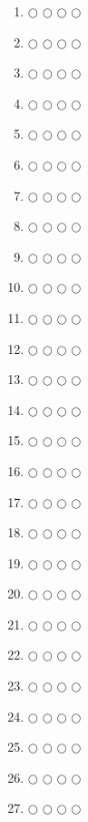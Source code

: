 \documentclass[a4paper,12pt]{article}
\begin{document}
\begin{multicols}{4}
\large
\begin{enumerate}
  \item $\bigcirc$ $\bigcirc$ $\bigcirc$ $\bigcirc$
  \item $\bigcirc$ $\bigcirc$ $\bigcirc$ $\bigcirc$
  \item $\bigcirc$ $\bigcirc$ $\bigcirc$ $\bigcirc$
  \item $\bigcirc$ $\bigcirc$ $\bigcirc$ $\bigcirc$
  \item $\bigcirc$ $\bigcirc$ $\bigcirc$ $\bigcirc$
  \item $\bigcirc$ $\bigcirc$ $\bigcirc$ $\bigcirc$
  \item $\bigcirc$ $\bigcirc$ $\bigcirc$ $\bigcirc$
  \item $\bigcirc$ $\bigcirc$ $\bigcirc$ $\bigcirc$
  \item $\bigcirc$ $\bigcirc$ $\bigcirc$ $\bigcirc$
  \item $\bigcirc$ $\bigcirc$ $\bigcirc$ $\bigcirc$
  \item $\bigcirc$ $\bigcirc$ $\bigcirc$ $\bigcirc$
  \item $\bigcirc$ $\bigcirc$ $\bigcirc$ $\bigcirc$
  \item $\bigcirc$ $\bigcirc$ $\bigcirc$ $\bigcirc$
  \item $\bigcirc$ $\bigcirc$ $\bigcirc$ $\bigcirc$
  \item $\bigcirc$ $\bigcirc$ $\bigcirc$ $\bigcirc$
  \item $\bigcirc$ $\bigcirc$ $\bigcirc$ $\bigcirc$
  \item $\bigcirc$ $\bigcirc$ $\bigcirc$ $\bigcirc$
  \item $\bigcirc$ $\bigcirc$ $\bigcirc$ $\bigcirc$
  \item $\bigcirc$ $\bigcirc$ $\bigcirc$ $\bigcirc$
  \item $\bigcirc$ $\bigcirc$ $\bigcirc$ $\bigcirc$
  \item $\bigcirc$ $\bigcirc$ $\bigcirc$ $\bigcirc$
  \item $\bigcirc$ $\bigcirc$ $\bigcirc$ $\bigcirc$
  \item $\bigcirc$ $\bigcirc$ $\bigcirc$ $\bigcirc$
  \item $\bigcirc$ $\bigcirc$ $\bigcirc$ $\bigcirc$
  \item $\bigcirc$ $\bigcirc$ $\bigcirc$ $\bigcirc$
  \item $\bigcirc$ $\bigcirc$ $\bigcirc$ $\bigcirc$
  \item $\bigcirc$ $\bigcirc$ $\bigcirc$ $\bigcirc$

\end{enumerate}
\end{multicols}
\end{document}
